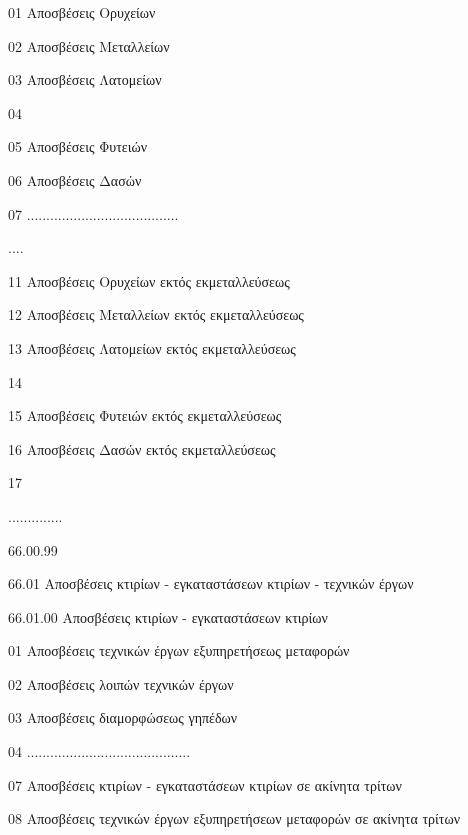 \documentclass[A4,10pt,greek]{book}
\begin{document}
                               01   Αποσβέσεις Ορυχείων

                               02   Αποσβέσεις Μεταλλείων

                               03   Αποσβέσεις Λατομείων

                               04

                               05   Αποσβέσεις Φυτειών

                               06   Αποσβέσεις Δασών

                               07   .......................................

                               ....

                               11   Αποσβέσεις Ορυχείων εκτός εκμεταλλεύσεως

                               12   Αποσβέσεις Μεταλλείων εκτός εκμεταλλεύσεως

                               13   Αποσβέσεις Λατομείων εκτός εκμεταλλεύσεως

                               14

                               15   Αποσβέσεις Φυτειών εκτός εκμεταλλεύσεως

                               16   Αποσβέσεις Δασών εκτός εκμεταλλεύσεως

                               17

                     ..............

                     66.00.99

        66.01   Αποσβέσεις κτιρίων - εγκαταστάσεων κτιρίων - τεχνικών έργων

                     66.01.00   Αποσβέσεις κτιρίων - εγκαταστάσεων κτιρίων

                               01   Αποσβέσεις τεχνικών έργων εξυπηρετήσεως μεταφορών

                               02   Αποσβέσεις λοιπών τεχνικών έργων

                               03   Αποσβέσεις διαμορφώσεως γηπέδων

                               04   ..........................................

                               07   Αποσβέσεις κτιρίων - εγκαταστάσεων κτιρίων
                                       σε ακίνητα τρίτων

                               08   Αποσβέσεις τεχνικών έργων εξυπηρετήσεων
                                       μεταφορών σε ακίνητα τρίτων
\end{document}
